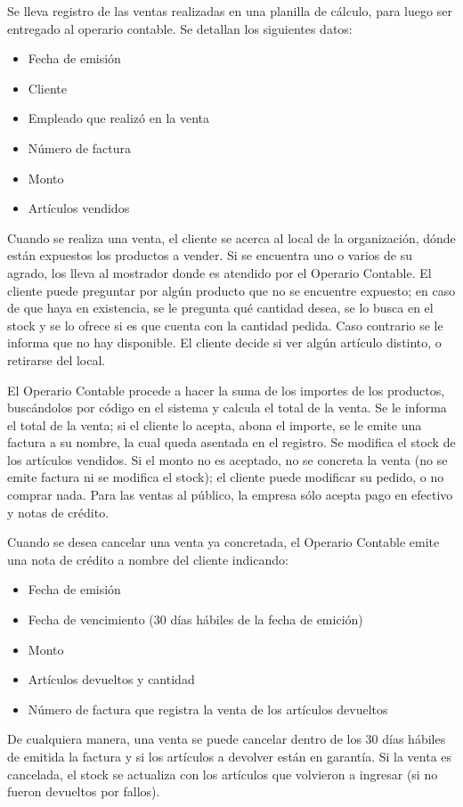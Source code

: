 \documentclass[12pt]{extarticle}
\begin{document}
\begin{spacing}{1.2}
    Se lleva registro de las ventas realizadas en una planilla de cálculo, para luego ser entregado al operario contable. Se detallan los siguientes datos:
    \begin{itemize}
        \item Fecha de emisión
        \item Cliente
        \item Empleado que realizó en la venta
        \item Número de factura
        \item Monto
        \item Artículos vendidos
    \end{itemize}

    Cuando se realiza una venta, el cliente se acerca al local de la organización, dónde están expuestos los productos a vender. Si se encuentra uno o varios de su agrado, los lleva al mostrador donde es atendido por el Operario Contable. 
    El cliente puede preguntar por algún producto que no se encuentre expuesto; en caso de que haya en existencia, se le pregunta qué cantidad desea, se lo busca en el stock y se lo ofrece si es que cuenta con la cantidad pedida. Caso contrario se le informa que no hay disponible. El cliente decide si ver algún artículo distinto, o retirarse del local.

    El Operario Contable procede a hacer la suma de los importes de los productos, buscándolos por código en el sistema y calcula el total de la venta. Se le informa el total de la venta; si el cliente lo acepta, abona el importe, se le emite una factura a su nombre, la cual queda asentada en el registro. Se modifica el stock de los artículos vendidos. 
    Si el monto no es aceptado, no se concreta la venta (no se emite factura ni se modifica el stock); el cliente puede modificar su pedido, o no comprar nada.
    Para las ventas al público, la empresa sólo acepta pago en efectivo y notas de crédito.

    Cuando se desea cancelar una venta ya concretada, el Operario Contable emite una nota de crédito a nombre del cliente indicando:
    \begin{itemize}
        \item Fecha de emisión
        \item Fecha de vencimiento (30 días hábiles de la fecha de emición)
        \item Monto
        \item Artículos devueltos y cantidad
        \item Número de factura que registra la venta de los artículos devueltos
    \end{itemize}
    De cualquiera manera, una venta se puede cancelar dentro de los 30 días hábiles de emitida la factura y si los artículos a devolver están en garantía. Si la venta es cancelada, el stock se actualiza con los artículos que volvieron a ingresar (si no fueron devueltos por fallos).


\end{spacing}
\end{document}
